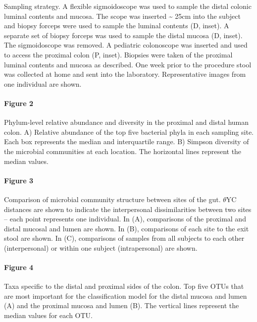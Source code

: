 \documentclass[12pt,]{article}
\let\oldparagraph\paragraph
\renewcommand{\paragraph}[1]{\oldparagraph{#1}\mbox{}}
\begin{document}
Sampling strategy. A flexible sigmoidoscope was used to sample the
distal colonic luminal contents and mucosa. The scope was inserted
\textasciitilde{} 25cm into the subject and biopsy forceps were used to
sample the luminal contents (D, inset). A separate set of biopsy forceps
was used to sample the distal mucosa (D, inset). The sigmoidoscope was
removed. A pediatric colonoscope was inserted and used to access the
proximal colon (P, inset). Biopsies were taken of the proximal luminal
contents and mucosa as described. One week prior to the procedure stool
was collected at home and sent into the laboratory. Representative
images from one individual are shown.

\newpage

\paragraph{Figure 2}\label{figure-2}

Phylum-level relative abundance and diversity in the proximal and distal
human colon. A) Relative abundance of the top five bacterial phyla in
each sampling site. Each box represents the median and interquartile
range. B) Simpson diversity of the microbial communities at each
location. The horizontal lines represent the median values.

\newpage

\paragraph{Figure 3}\label{figure-3}

Comparison of microbial community structure between sites of the gut.
\(\theta\)YC distances are shown to indicate the interpersonal
dissimilarities between two sites -- each point represents one
individual. In (A), comparisons of the proximal and distal mucosal and
lumen are shown. In (B), comparisons of each site to the exit stool are
shown. In (C), comparisons of samples from all subjects to each other
(interpersonal) or within one subject (intrapersonal) are shown.

\newpage

\paragraph{Figure 4}\label{figure-4}

Taxa specific to the distal and proximal sides of the colon. Top five
OTUs that are most important for the classification model for the distal
mucosa and lumen (A) and the proximal mucosa and lumen (B). The vertical
lines represent the median values for each OTU.
\end{document}
